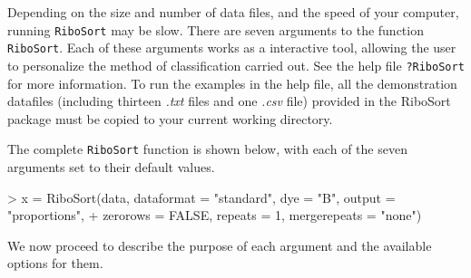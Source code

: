 \documentclass[a4paper]{article}
\begin{document}
Depending on the size and number of  data files, and the speed of your computer, running \texttt{RiboSort} may be slow. There are seven arguments to the function \texttt{RiboSort}. Each of these arguments works as a interactive tool, allowing the user to personalize the method of classification carried out. See the help file \texttt{?RiboSort} for more information. To run the examples in the help file, all the demonstration datafiles (including thirteen \textit{.txt} files and one \textit{.csv} file) provided in the RiboSort package must be copied to your current working directory. 

The complete \texttt{RiboSort} function is shown below, with each of the seven arguments set to their default values.

\begin{Schunk}
\begin{Sinput}
> x = RiboSort(data, dataformat = "standard", dye = "B", output = "proportions", 
+     zerorows = FALSE, repeats = 1, mergerepeats = "none")
\end{Sinput}
\end{Schunk}
We now proceed to describe the purpose of each argument and the available options for them.
\end{document}
